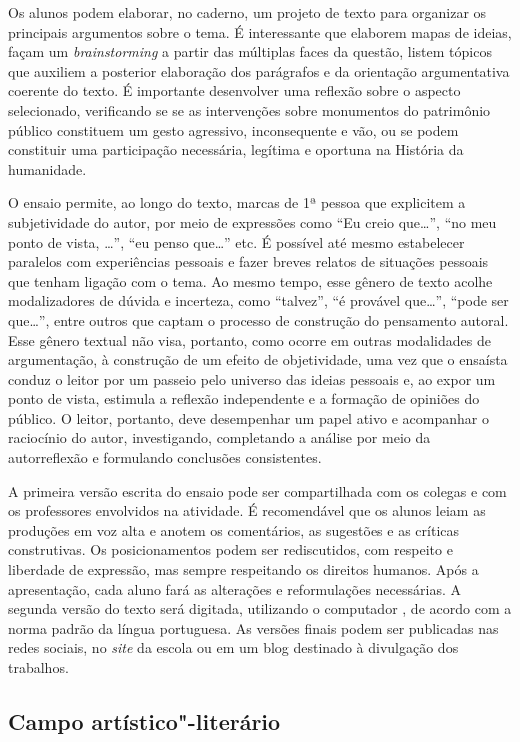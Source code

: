 \documentclass[11pt]{extarticle}
\begin{document}
Os alunos podem elaborar, no caderno, um projeto de texto para organizar
os principais argumentos sobre o tema. É interessante que elaborem mapas
de ideias, façam um \emph{brainstorming} a partir das múltiplas faces da
questão, listem tópicos que auxiliem a posterior elaboração dos
parágrafos e da orientação argumentativa coerente do texto. É importante
desenvolver uma reflexão sobre o aspecto selecionado, verificando se se
as intervenções sobre monumentos do patrimônio público constituem um
gesto agressivo, inconsequente e vão, ou se podem constituir uma
participação necessária, legítima e oportuna na História da humanidade.

O ensaio permite, ao longo do texto, marcas de 1ª pessoa que explicitem
a subjetividade do autor, por meio de expressões como ``Eu creio
que\ldots{}'', ``no meu ponto de vista, \ldots{}'', ``eu penso que\ldots{}'' etc. É
possível até mesmo estabelecer paralelos com experiências pessoais e
fazer breves relatos de situações pessoais que tenham ligação com o
tema. Ao mesmo tempo, esse gênero de texto acolhe modalizadores de
dúvida e incerteza, como ``talvez'', ``é provável que\ldots{}'', ``pode ser
que\ldots{}'', entre outros que captam o processo de construção do pensamento
autoral. Esse gênero textual não visa, portanto, como ocorre em outras
modalidades de argumentação, à construção de um efeito de objetividade,
uma vez que o ensaísta conduz o leitor por um passeio pelo universo das
ideias pessoais e, ao expor um ponto de vista, estimula a reflexão
independente e a formação de opiniões do público. O leitor, portanto,
deve desempenhar um papel ativo e acompanhar o raciocínio do autor,
investigando, completando a análise por meio da autorreflexão e
formulando conclusões consistentes.

A primeira versão escrita do ensaio pode ser compartilhada com os
colegas e com os professores envolvidos na atividade. É recomendável que
os alunos leiam as produções em voz alta e anotem os comentários, as
sugestões e as críticas construtivas. Os posicionamentos podem ser
rediscutidos, com respeito e liberdade de expressão, mas sempre
respeitando os direitos humanos. Após a apresentação, cada aluno fará as
alterações e reformulações necessárias. A segunda versão do texto será
digitada, utilizando o computador , de acordo com a norma padrão da
língua portuguesa. As versões finais podem ser publicadas nas redes
sociais, no \emph{site} da escola ou em um blog destinado à divulgação
dos trabalhos.

\subsection{Campo artístico"-literário}
\end{document}
